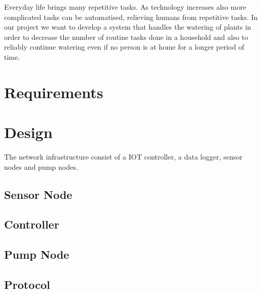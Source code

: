 \documentclass[12pt,a4paper,titlepage,oneside]{article}
\begin{document}
\maketitle



 
 
Everyday life brings many repetitive tasks. As technology increases also more complicated tasks can be automatised, relieving humans from repetitive tasks. In our project we want to develop a system that handles the watering of plants in order to decrease the number of routine tasks done in a household and also to reliably continue watering even if no person is at home for a longer period of time.

\section{Requirements}



\section{Design}
The network infrastructure consist of a IOT controller, a data logger, sensor nodes and pump nodes.


\subsection{Sensor Node}


\subsection{Controller}


\subsection{Pump Node}


\subsection{Protocol}










\clearpage 
{}
{}


\printindex
\printindex
\end{document}
